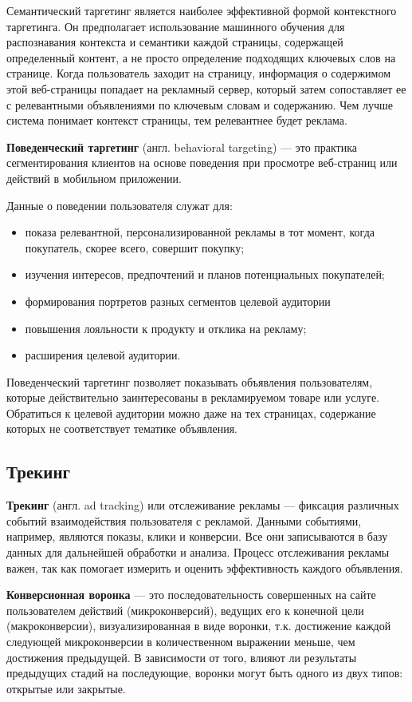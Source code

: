\documentclass[specification,annotation,times]{itmo-student-thesis}
\begin{document}
Семантический таргетинг является наиболее эффективной формой контекстного таргетинга. Он предполагает использование машинного обучения для распознавания контекста и семантики каждой страницы, содержащей определенный контент, а не просто определение подходящих ключевых слов на странице. Когда пользователь заходит на страницу, информация о содержимом этой веб-страницы попадает на рекламный сервер, который затем сопоставляет ее с релевантными объявлениями по ключевым словам и содержанию. Чем лучше система понимает контекст страницы, тем релевантнее будет реклама.

\textbf{Поведенческий таргетинг} (англ. behavioral targeting)\label{behavioral-targeting} — это практика сегментирования клиентов на основе поведения при просмотре веб-страниц или действий в мобильном приложении. 

Данные о поведении пользователя служат для:
\begin{itemize}
\item показа релевантной, персонализированной рекламы в тот момент, когда покупатель, скорее всего, совершит покупку;
\item изучения интересов, предпочтений и планов потенциальных покупателей;
\item формирования портретов разных сегментов целевой аудитории
\item повышения лояльности к продукту и отклика на рекламу;
\item расширения целевой аудитории.
\end{itemize}

Поведенческий таргетинг позволяет показывать объявления пользователям, которые действительно заинтересованы в рекламируемом товаре или услуге. Обратиться к целевой аудитории можно даже на тех страницах, содержание которых не соответствует тематике объявления.

\subsection{Трекинг}

\textbf{Трекинг} (англ. ad tracking) \label{tracking} или отслеживание рекламы — фиксация различных событий взаимодействия пользователя с рекламой. Данными событиями, например, являются показы, клики и конверсии. Все они записываются в базу данных для дальнейшей обработки и анализа. Процесс отслеживания рекламы важен, так как помогает измерить и оценить эффективность каждого объявления.

\textbf{Конверсионная воронка}  — это последовательность совершенных на сайте пользователем действий (микроконверсий), ведущих его к конечной цели (макроконверсии), визуализированная в виде воронки, т.к. достижение каждой следующей микроконверсии в количественном выражении меньше, чем достижения предыдущей. В зависимости от того, влияют ли результаты предыдущих стадий на последующие, воронки могут быть одного из двух типов: открытые или закрытые.
\end{document}
